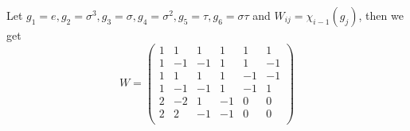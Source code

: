 \documentclass{ctexart}
\begin{document}
\begin{solution}
\begin{enumerate}
		      Let \(g_1=e,g_2=\sigma^3,g_3=\sigma,g_4=\sigma^2,g_5=\tau,g_6=\sigma \tau\) and \(W_{ij}=\chi_{i-1}( g_j)\), then we get
		      \[
			      W=\begin{pmatrix}
				      1 & 1  & 1  & 1  & 1  & 1  \\
				      1 & -1 & -1 & 1  & 1  & -1 \\
				      1 & 1  & 1  & 1  & -1 & -1 \\
				      1 & -1 & -1 & 1  & -1 & 1  \\
				      2 & -2 & 1  & -1 & 0  & 0  \\
				      2 & 2  & -1 & -1 & 0  & 0  \\
			      \end{pmatrix}
		      \]
	\end{enumerate}
\end{solution}
\end{document}
